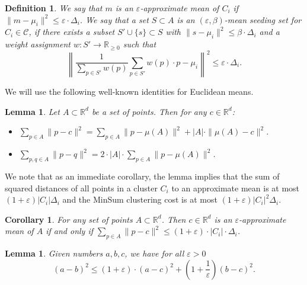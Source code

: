\documentclass[11pt]{article}
\newtheorem{corollary}[theorem]{Corollary}
\newtheorem{lemma}[theorem]{Lemma}
\newtheorem{definition}[theorem]{Definition}
\begin{document}
\begin{definition}
We say that $m$ is an $\varepsilon$-approximate mean of $C_i$ if $\|m-\mu_i\|^2 \leq \varepsilon\cdot \Delta_i$.
We say that a set $S\subset A$ is an $(\varepsilon,\beta)$-mean seeding set for $C_i\in \mathcal{C}$, if there exists a subset $S'\cup \{s\}\subset S$ 
with $\|s-\mu_i\|^2 \leq \beta\cdot \Delta_i$
and a weight assignment $w:S'\rightarrow \mathbb{R}_{\geq 0}$ such that 
$$
\left\|\frac{1}{\sum_{p\in S'}w(p)}\sum_{p\in S'} w(p)\cdot p - \mu_i\right\|^2 \leq \varepsilon\cdot \Delta_i.
$$
\end{definition}

We will use the following well-known identities for Euclidean means.
\begin{lemma}
\cite{InabaKI94}
\label{lem:magic}
    Let $A\subset \mathbb{R}^d$ be a set of points. Then for any $c\in \mathbb{R}^d$:
    \begin{itemize}
        \item $\sum_{p\in A} \|p-c\|^2 = \sum_{p\in A} \|p-\mu(A)\|^2 + |A|\cdot \|\mu(A)-c\|^2$.
        \item $\sum_{p,q\in A} \|p-q\|^2 = 2\cdot |A|\cdot \sum_{p\in A} \|p-\mu(A)\|^2$.
    \end{itemize}
\end{lemma}
We note that as an immediate corollary, the lemma implies that the sum of squared distances of all points in a cluster $C_i$ to an approximate mean is at most $(1+\varepsilon)|C_i|\Delta_i$ and the MinSum clustering cost is at most $(1+\varepsilon)|C_i|^2\Delta_i$.
\begin{corollary}
\label{cor:approxmean}
For any set of points $A\subset \mathbb{R}^d$. Then $c\in \mathbb{R}^d$ is an $\varepsilon$-approximate mean of $A$ if and only if $\sum_{p\in A} \|p-c\|^2 \leq (1+\varepsilon)\cdot |C_i|\cdot \Delta_i$.
\end{corollary}
\begin{lemma}
    \cite{BecchettiBC0S19}
    \label{lem:weaktriangle}
    Given numbers $a,b,c$, we have for all $\varepsilon>0$
    $$(a-b)^2 \leq (1+\varepsilon)\cdot (a-c)^2 + \left(1+\frac{1}{\varepsilon}\right)(b-c)^2.$$
\end{lemma}
\end{document}
